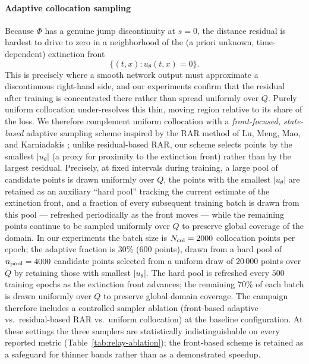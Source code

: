 \documentclass[11pt]{elsarticle}
\theoremstyle{definition}
\theoremstyle{remark}
\numberwithin{equation}{section}
\begin{document}
\paragraph{Adaptive collocation sampling}
Because $\Phi$ has a genuine jump discontinuity at $s=0$, the distance
residual is hardest to drive to zero in a neighborhood of the (a priori
unknown, time-dependent) extinction front $$\{(t,x):u_\theta(t,x)=0\}.$$ This
is precisely where a smooth network output must approximate a discontinuous
right-hand side, and our experiments confirm that the residual after
training is concentrated there rather than spread uniformly over $Q$.
Purely uniform collocation under-resolves this thin, moving region relative
to its share of the loss. We therefore complement uniform collocation with
a \emph{front-focused, state-based} adaptive sampling scheme inspired by
the RAR method of Lu, Meng, Mao, and Karniadakis
\cite{LuMengMaoKarniadakis2021DeepXDE}; unlike residual-based RAR, our
scheme selects points by the smallest $|u_\theta|$ (a proxy for proximity
to the extinction front) rather than by the largest residual. Precisely, at fixed intervals during training,
a large pool of candidate points is drawn uniformly over $Q$, the points
with the smallest $|u_\theta|$ are retained as an auxiliary ``hard pool''
tracking the current estimate of the extinction front, and a fraction of
every subsequent training batch is drawn from this pool — refreshed
periodically as the front moves — while the remaining points continue to be
sampled uniformly over $Q$ to preserve global coverage of the domain.
In our experiments the batch size is $N_{\rm col}=2000$ collocation points per
epoch; the adaptive fraction is $30\%$ (600 points), drawn from a hard pool
of $n_{\rm pool}=4000$ candidate points selected from a uniform draw of
$20\,000$ points over $Q$ by retaining those with smallest $|u_\theta|$.
The hard pool is refreshed every $500$ training epochs as the extinction
front advances; the remaining $70\%$ of each batch is drawn uniformly over
$Q$ to preserve global domain coverage. The campaign therefore includes a controlled sampler ablation
(front-based adaptive vs.\ residual-based RAR vs.\ uniform collocation) at
the baseline configuration. At these settings the three samplers are
statistically indistinguishable on every reported metric
(Table~\ref{tab:relay-ablation}); the front-based scheme is retained as a
safeguard for thinner bands rather than as a demonstrated speedup.
\end{document}
